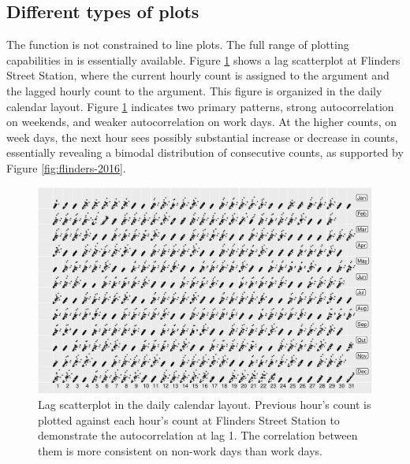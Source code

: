 \documentclass[article]{jss}
\theoremstyle{definition}
\theoremstyle{definition}
\theoremstyle{definition}
\theoremstyle{remark}
\begin{document}
\subsection{Different types of plots}\label{different-types-of-plots}

The  function is not constrained to line plots. The
full range of plotting capabilities in  is essentially
available. Figure \ref{fig:scatterplot} shows a lag scatterplot at
Flinders Street Station, where the current hourly count is assigned to
the  argument and the lagged hourly count to the 
argument. This figure is organized in the daily calendar layout. Figure
\ref{fig:scatterplot} indicates two primary patterns, strong
autocorrelation on weekends, and weaker autocorrelation on work days. At
the higher counts, on week days, the next hour sees possibly substantial
increase or decrease in counts, essentially revealing a bimodal
distribution of consecutive counts, as supported by Figure
\ref{fig:flinders-2016}.

\begin{CodeChunk}
\begin{figure}

{\centering \includegraphics[width=\textwidth]{figure/scatterplot-1} 

}

\caption[Lag scatterplot in the daily calendar layout.
Previous hour's count is plotted against each hour's count at Flinders
Street Station to demonstrate the autocorrelation at lag 1. The
correlation between them is more consistent on non-work days than work
days.]{Lag scatterplot in the daily calendar layout.
Previous hour's count is plotted against each hour's count at Flinders
Street Station to demonstrate the autocorrelation at lag 1. The
correlation between them is more consistent on non-work days than work
days.}\label{fig:scatterplot}
\end{figure}
\end{CodeChunk}
\end{document}
